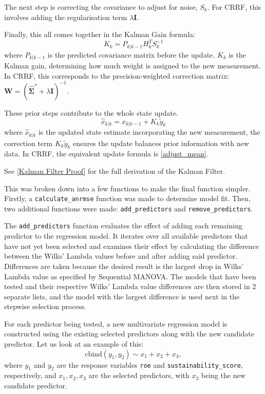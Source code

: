 The next step is correcting the covariance to adjust for noise, $S_k$. For CRRF, this involves adding the regularisation term $\lambda \mathbf{I}$.

\noindent Finally, this all comes together in the Kalman Gain formula:
\begin{equation*}
    K_k = P_{k|k-1} H_k^T S_k^{-1}
\end{equation*}
where $P_{k|k-1}$ is the predicted covariance matrix before the update.\cite{faragher2012understanding} $K_k$ is the {Kalman gain}, determining how much weight is assigned to the new measurement.\cite{faragher2012understanding} In CRRF, this corresponds to the precision-weighted correction matrix: $\mathbf{W} = (\hat{\mathbf{\Sigma}}^* + \lambda \mathbf{I})^{-1}.$

These prior steps contribute to the whole state update. \begin{equation*}
    \hat{x}_{k|k} = \hat{x}_{k|k-1} + K_k \tilde{y}_k
\end{equation*}
where $\hat{x}_{k|k}$ is the {updated state estimate} incorporating the new measurement, the correction term $K_k \tilde{y}_k$ ensures the update balances prior information with new data.\cite{faragher2012understanding} In CRRF, the equivalent update formula is \ref{adjust_mean}.

\noindent See \ref{Kalman Filter Proof} for the full derivation of the Kalman Filter.


This was broken down into a few functions to make the final function simpler. Firstly, a \texttt{calculate\_anrmse} function was made to determine model fit. Then, two additional functions were made: \texttt{add\_predictors} and \texttt{remove\_predictors}.

The \texttt{add\_predictors} function evaluates the effect of adding each remaining predictor to the regression model. It iterates over all available predictors that have not yet been selected and examines their effect by calculating the difference between the Wilks' Lambda values before and after adding said predictor. Differences are taken because the desired result is the largest drop in Wilks' Lambda value as specified by Sequential MANOVA. The models that have been tested and their respective Wilks' Lambda value differences are then stored in 2 separate lists, and the model with the largest difference is used next in the stepwise selection process. 

For each predictor being tested, a new multivariate regression model is constructed using the existing selected predictors along with the new candidate predictor. Let us look at an example of this: 
\[\text{cbind}(y_1, y_2) \sim x_1 + x_2 + x_3,\]
\noindent where \( y_1 \) and \( y_2 \) are the response variables \texttt{roe} and \texttt{sustainability\_score}, respectively, and \( x_1, x_2, x_3 \) are the selected predictors, with \( x_3 \) being the new candidate predictor. 

